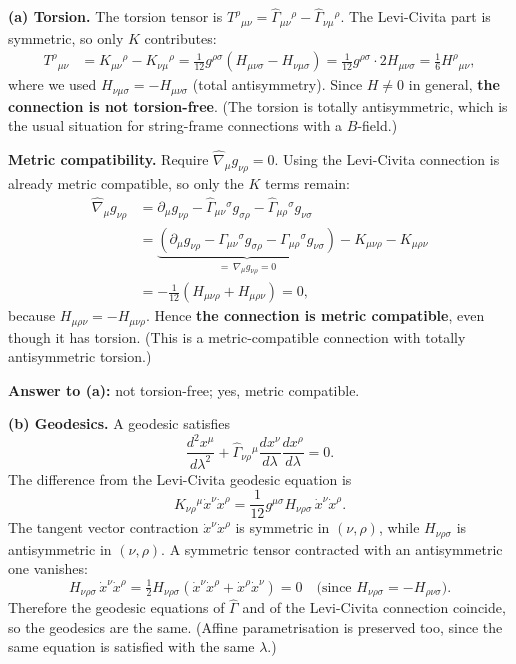\documentclass[12pt]{article}
\newcommand{\be}{\begin{equation}}
\newcommand{\ee}{\end{equation}}
\begin{document}
\textbf{(a) Torsion.} The torsion tensor is $T^\rho{}_{\mu\nu} = \hat\Gamma_{\mu\nu}{}^\rho - \hat\Gamma_{\nu\mu}{}^\rho$. The Levi-Civita part is symmetric, so only $K$ contributes:
\begin{align*}
T^\rho{}_{\mu\nu} &= K_{\mu\nu}{}^\rho - K_{\nu\mu}{}^\rho
= \frac{1}{12} g^{\rho\sigma}\left(H_{\mu\nu\sigma} - H_{\nu\mu\sigma}\right)
= \frac{1}{12} g^{\rho\sigma}\cdot 2H_{\mu\nu\sigma}
= \frac{1}{6} H^\rho{}_{\mu\nu},
\end{align*}
where we used $H_{\nu\mu\sigma} = -H_{\mu\nu\sigma}$ (total antisymmetry). Since $H\neq 0$ in general, \textbf{the connection is not torsion-free}. (The torsion is totally antisymmetric, which is the usual situation for string-frame connections with a $B$-field.)

\textbf{Metric compatibility.} Require $\hat\nabla_\mu g_{\nu\rho}=0$. Using the Levi-Civita connection is already metric compatible, so only the $K$ terms remain:
\begin{align*}
\hat\nabla_\mu g_{\nu\rho}
&= \partial_\mu g_{\nu\rho} - \hat\Gamma_{\mu\nu}{}^\sigma g_{\sigma\rho} - \hat\Gamma_{\mu\rho}{}^\sigma g_{\nu\sigma} \\
&= \underbrace{\left(\partial_\mu g_{\nu\rho} - \Gamma_{\mu\nu}{}^\sigma g_{\sigma\rho} - \Gamma_{\mu\rho}{}^\sigma g_{\nu\sigma}\right)}_{=\,\nabla_\mu g_{\nu\rho}=0} - K_{\mu\nu\rho} - K_{\mu\rho\nu} \\
&= -\frac{1}{12}\left(H_{\mu\nu\rho} + H_{\mu\rho\nu}\right) = 0,
\end{align*}
because $H_{\mu\rho\nu} = -H_{\mu\nu\rho}$. Hence \textbf{the connection is metric compatible}, even though it has torsion. (This is a metric-compatible connection with totally antisymmetric torsion.)

\textbf{Answer to (a):} not torsion-free; yes, metric compatible.

\textbf{(b) Geodesics.} A geodesic satisfies
\be
\frac{d^2 x^\mu}{d\lambda^2} + \hat\Gamma_{\nu\rho}{}^\mu \frac{dx^\nu}{d\lambda}\frac{dx^\rho}{d\lambda} = 0.
\ee
The difference from the Levi-Civita geodesic equation is
\be
K_{\nu\rho}{}^\mu \dot x^\nu \dot x^\rho = \frac{1}{12} g^{\mu\sigma} H_{\nu\rho\sigma}\, \dot x^\nu \dot x^\rho.
\ee
The tangent vector contraction $\dot x^\nu \dot x^\rho$ is symmetric in $(\nu,\rho)$, while $H_{\nu\rho\sigma}$ is antisymmetric in $(\nu,\rho)$. A symmetric tensor contracted with an antisymmetric one vanishes:
\be
H_{\nu\rho\sigma}\,\dot x^\nu \dot x^\rho = \tfrac12 H_{\nu\rho\sigma}\left(\dot x^\nu \dot x^\rho + \dot x^\rho \dot x^\nu\right) = 0 \quad\text{(since } H_{\nu\rho\sigma} = -H_{\rho\nu\sigma}\text{)}.
\ee
Therefore the geodesic equations of $\hat\Gamma$ and of the Levi-Civita connection coincide, so the geodesics are the same. (Affine parametrisation is preserved too, since the same equation is satisfied with the same $\lambda$.)
\end{document}

